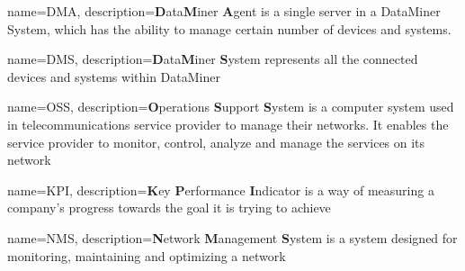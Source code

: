 {
    name=DMA,
    description={\textbf{D}ata\textbf{M}iner \textbf{A}gent is a single server in a DataMiner System, which has the ability to manage certain number of devices and systems.}
}

{
    name=DMS,
    description={\textbf{D}ata\textbf{M}iner \textbf{S}ystem represents all the connected devices and systems within DataMiner}
}

{
    name=OSS,
    description={\textbf{O}perations \textbf{S}upport \textbf{S}ystem is a computer system used in telecommunications service provider to manage their networks. It enables the service provider to monitor, control, analyze
    and manage the services on its network}
}

{
    name=KPI,
    description={\textbf{K}ey \textbf{P}erformance \textbf{I}ndicator is a way of measuring a company's progress towards the goal it is trying to achieve}
}

{
    name=NMS,
    description={\textbf{N}etwork \textbf{M}anagement \textbf{S}ystem is a system designed for monitoring, maintaining and optimizing a network}
}
